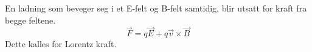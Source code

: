 En ladning som beveger seg i et E-felt og B-felt samtidig,
blir utsatt for kraft fra begge feltene.
$$\vec{F} = q\vec{E} + q\vec{v}\times\vec{B}$$
Dette kalles for Lorentz kraft.
